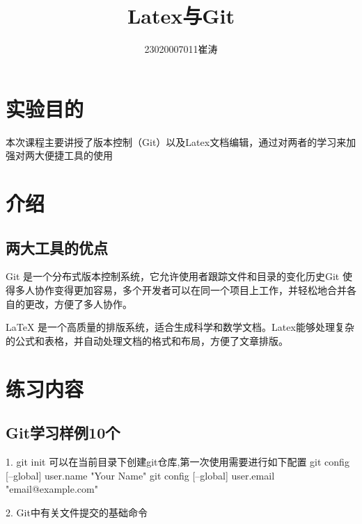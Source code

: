 \documentclass{article}
\title{Latex与Git}
\author{23020007011崔涛}
\begin{document}
\maketitle

\section{实验目的}
本次课程主要讲授了版本控制（Git）以及Latex文档编辑，通过对两者的学习来加强对两大便捷工具的使用

\section{介绍}
\subsection{两大工具的优点}
Git 是一个分布式版本控制系统，它允许使用者跟踪文件和目录的变化历史Git 使得多人协作变得更加容易，多个开发者可以在同一个项目上工作，并轻松地合并各自的更改，方便了多人协作。

LaTeX 是一个高质量的排版系统，适合生成科学和数学文档。Latex能够处理复杂的公式和表格，并自动处理文档的格式和布局，方便了文章排版。
\section{练习内容}
\subsection{Git学习样例10个}
1. git init 可以在当前目录下创建git仓库,第一次使用需要进行如下配置\newspace
git config [--global] user.name "Your Name"   \newspace
git config [--global] user.email "email@example.com"  \newspace

2. Git中有关文件提交的基础命令
\end{document}
